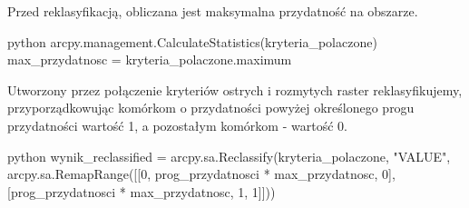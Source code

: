 \documentclass{article}
\begin{document}
Przed reklasyfikacją, obliczana jest maksymalna przydatność na obszarze.
\vspace{5pt}

\begin{mintedbox}{python}
arcpy.management.CalculateStatistics(kryteria_polaczone)
max_przydatnosc = kryteria_polaczone.maximum
\end{mintedbox}
\vspace{10pt}

Utworzony przez połączenie kryteriów ostrych i rozmytych raster reklasyfikujemy, przyporządkowując komórkom o przydatności powyżej określonego progu przydatności wartość 1, a pozostałym komórkom - wartość 0.
\vspace{5pt}

\begin{mintedbox}{python}
wynik_reclassified = arcpy.sa.Reclassify(kryteria_polaczone, "VALUE", arcpy.sa.RemapRange([[0, prog_przydatnosci * max_przydatnosc, 0], [prog_przydatnosci * max_przydatnosc, 1, 1]]))
\end{mintedbox}
\vspace{5pt}
\end{document}
